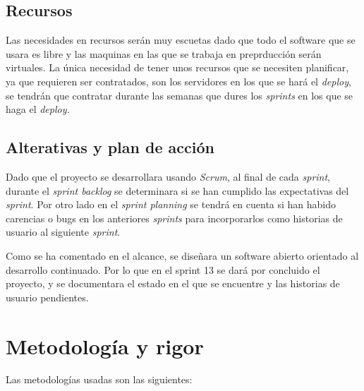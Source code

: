 \documentclass[12pt]{article} %
\begin{document}
\subsection{Recursos}
Las necesidades en recursos serán muy escuetas dado que todo el software que se usara es libre y las maquinas en las que se trabaja en preprducción serán virtuales. La única necesidad de tener unos recursos que se necesiten planificar, ya que requieren ser contratados, son los servidores en los que se hará el \textit{deploy}, se tendrán que contratar durante las semanas que dures los \textit{sprints} en los que se haga el \textit{deploy.}

\subsection{Alterativas y plan de acción}
Dado que el proyecto se desarrollara usando \textit{Scrum}, al final de cada \textit{sprint}, durante el \textit{sprint backlog} se determinara si se han  
cumplido las expectativas del \textit{sprint}. Por otro lado en el \textit{sprint planning} se tendrá en cuenta si han habido carencias o bugs en los anteriores \textit{sprints} para incorporarlos como historias de usuario al siguiente \textit{sprint}. 

Como se ha comentado en el alcance, se diseñara un software abierto orientado al desarrollo continuado. Por lo que en el sprint 13 se dará por concluido el proyecto, y se documentara el estado en el que se encuentre y las historias de usuario pendientes.

\section{Metodología y rigor}

Las metodologías usadas son las siguientes:
\end{document}
